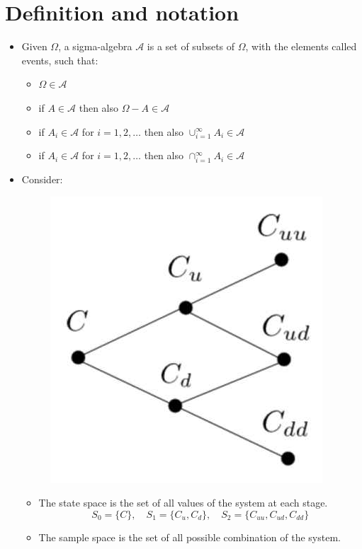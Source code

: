 \documentclass[12pt, openany]{report}
\newcommand{\A}{\mathcal{A}}
\theoremstyle{definition}
\begin{document}
\chapter{Definition and notation}
\begin{itemize}
	\item Given $\Omega$, a sigma-algebra $\A$ is a set of subsets of $\Omega$, with the elements called events, such that:
	\begin{itemize}
		\item $\Omega \in \A$
		\item if $A \in \A$ then also $\Omega - A \in \A$
		\item if $A_i \in \A$ for $i = 1,2, \dots$ then also $\cup_{i=1}^\infty A_i \in \A$
		\item if $A_i \in \A$ for $i = 1,2, \dots$ then also $\cap_{i=1}^\infty A_i \in \A$
	\end{itemize}
	\item Consider: 
	\begin{figure}[H]
		\centering
		\includegraphics[scale=0.25]{img/space.jpg} 
	\end{figure}
	\begin{itemize}
		\item The state space is the set of all values of the system at each stage. 
		\begin{equation}
			S_0 = \{C\},\quad S_1 = \{C_u, C_d\},\quad S_2 = \{C_{uu}, C_{ud}, C_{dd}\}
		\end{equation}
		\item  The sample space is the set of all possible combination of the system.

\end{itemize}
\end{itemize}
\end{document}
